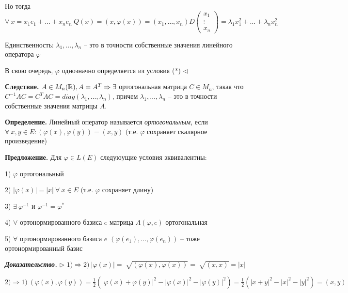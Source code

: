 Но тогда $\forall \ x = x_1 e_1 + \dots + x_n e_n \ Q(x) = (x, \varphi(x)) = (x_1, \dots, x_n) D \begin{pmatrix}
x_1 \\ \vdots \\ x_n \end{pmatrix} = \lambda_1 x_1^2 + \dots + \lambda_n x_n^2$

\vspace{\baselineskip}
Единственность: $\lambda_1, \dots, \lambda_n$ -- это в точности собственные значения линейного оператора $\varphi$

В свою очередь, $\varphi$ однозначно определяется из условия (*) $\lhd$

\vspace{\baselineskip}
\textbf{Следствие.} $A \in M_n(\mathbb{R}), A = A^T \Rightarrow \exists$ ортогональная матрица $C \in M_n$, такая что $C^{-1} A C = C^T A C = diag(\lambda_1, \dots, \lambda_n)$, причем $\lambda_1, \dots, \lambda_n$ -- это в точности собственные значения матрицы $A$.

\vspace{\baselineskip}
\textbf{Определение.} Линейный оператор называется \textit{ортогональным}, если $\forall \ x, y \in E: (\varphi(x), \varphi(y)) = (x, y)$ (т.е. $\varphi$ сохраняет скалярное произведение)

\vspace{\baselineskip}
\textbf{Предложение.} Для $\varphi \in L(E)$ следуюущие условия эквивалентны:

1) $\varphi$ ортогональный

2) $|\varphi(x)| = |x| \ \forall \ x \in E$ (т.е. $\varphi$ сохраняет длину)

3) $\exists \ \varphi^{-1}$ и $\varphi^{-1} = \varphi^*$

4) $\forall$ ортонормированного базиса $e$ матрица $A(\varphi, e)$ ортогональная

5) $\forall$ ортонормированного базиса $e$ $(\varphi(e_1), \dots, \varphi(e_n))$ -- тоже ортонормированный базис

\vspace{\baselineskip}
\textbf{\textit{Доказательство.}} $\rhd$ $1) \Rightarrow 2) \ |\varphi(x)| = \sqrt[]{(\varphi(x), \varphi(x))} = \sqrt[]{(x, x)} = |x|$

\vspace{\baselineskip}
$2) \Rightarrow 1) \ (\varphi(x), \varphi(y)) = \frac{1}{2} (|\varphi(x) + \varphi(y)|^2 - |\varphi(x)|^2 - |\varphi(y)|^2) = \frac{1}{2} (|x+y|^2 - |x|^2 - |y|^2) = (x, y)$


